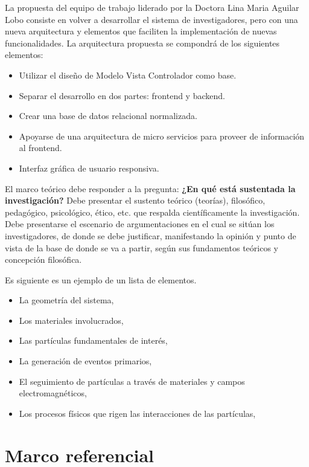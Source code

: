     La propuesta del equipo de trabajo liderado por la Doctora Lina Maria Aguilar Lobo consiste en volver a desarrollar el sistema de investigadores, pero con una nueva arquitectura y elementos que faciliten la implementación de nuevas funcionalidades. La arquitectura propuesta se compondrá de los siguientes elementos:
    
    \begin{itemize}
        \item Utilizar el diseño de Modelo Vista Controlador como base.
        \item Separar el desarrollo en dos partes: frontend y backend.
        \item Crear una base de datos relacional normalizada.
        \item Apoyarse de una arquitectura de micro servicios para proveer de información al frontend.
        \item Interfaz gráfica de usuario responsiva.
    \end{itemize}
    
    El marco teórico debe responder a la pregunta: \textbf{¿En qué está sustentada la investigación?}
    Debe presentar el sustento teórico (teorías), filosófico, pedagógico, psicológico, ético, etc. que respalda científicamente la investigación.
    Debe presentarse el escenario de argumentaciones en el cual se sitúan los investigadores, de donde se debe justificar, manifestando la opinión y punto de vista de la base de donde se va a partir, según sus fundamentos teóricos y concepción filosófica.
    
    Es siguiente es un ejemplo de un lista de elementos.
    
    \begin{itemize}
        \item La geometría del sistema,
        \item Los materiales involucrados,
        \item Las partículas fundamentales de interés,
        \item La generación de eventos primarios,
        \item El seguimiento de partículas a través de materiales y campos electromagnéticos,
        \item Los procesos físicos que rigen las interacciones de las partículas,
    \end{itemize}

\section{Marco referencial}

